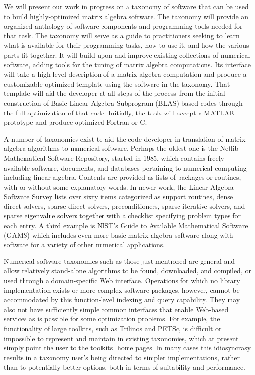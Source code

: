 \documentclass{report}
\begin{document}
We will present our work in progress on a taxonomy of software that can
be used to build highly-optimized matrix algebra software. The taxonomy
will provide an organized anthology of software components and programming
tools needed for that task. The taxonomy will serve as a guide to
practitioners seeking to learn what is available for their programming
tasks, how to use it, and how the various parts fit together. It will
build upon and improve existing collections of numerical software, adding
tools for the tuning of matrix algebra computations. Its interface will
take a high level description of a matrix algebra computation and produce
a customizable optimized template using the software in the taxonomy.
That template will aid the developer at all steps of the process--from
the initial construction of Basic Linear Algebra Subprogram (BLAS)-based
codes through the full optimization of that code. Initially, the tools
will accept a MATLAB prototype and produce optimized Fortran or C.

A number of taxonomies exist to aid the code developer in translation of
matrix algebra algorithms to numerical software. Perhaps the oldest one
is the Netlib Mathematical Software Repository, started in 1985, which
contains freely available software, documents, and databases pertaining
to numerical computing including linear algebra. Contents are provided
as lists of packages or routines, with or without some explanatory words.
In newer work, the Linear Algebra Software Survey lists over sixty items
categorized as support routines, dense direct solvers, sparse direct
solvers, preconditioners, sparse iterative solvers, and sparse eigenvalue
solvers together with a checklist specifying problem types for each entry.
A third example is NIST's Guide to Available Mathematical Software (GAMS)
which includes even more basic matrix algebra software along with software
for a variety of other numerical applications.

Numerical software taxonomies such as those just mentioned are general
and allow relatively stand-alone algorithms to be found, downloaded, and
compiled, or used through a domain-specific Web interface. Operations for
which no library implementation exists or more complex software packages,
however, cannot be accommodated by this function-level indexing and
query capability. They may also not have sufficiently simple common
interfaces that enable Web-based services as is possible for some
optimization problems. For example, the functionality of large toolkits,
such as Trilinos and PETSc, is difficult or impossible to represent and
maintain in existing taxonomies, which at present simply point the user
to the toolkits' home pages. In many cases this idiosyncrasy results in a
taxonomy user's being directed to simpler implementations, rather than to
potentially better options, both in terms of suitability and performance.
\end{document}
